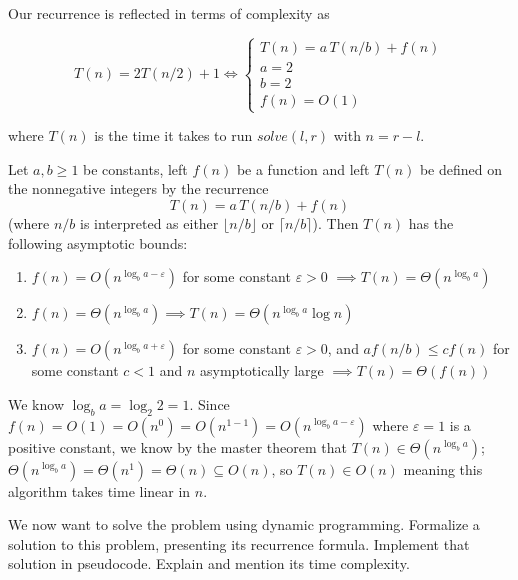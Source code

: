 {\newpage
Our recurrence is reflected in terms of complexity as

\begin{equation*}
    T(n) = 2T(n/2) + 1 \iff \begin{cases}
        T(n) = a\,T(n/b) + f(n) \\
        a = 2 \\
        b = 2 \\
        f(n) = O(1)
    \end{cases}
\end{equation*}

where $T(n)$ is the time it takes to run $solve(l, r)$ with $n = r-l$.

\begin{theorem}
    Let $a, b \geq 1$ be constants, left $f(n)$ be a function and left $T(n)$ be defined on the nonnegative integers by the recurrence
    \begin{equation*}
        T(n) = a\,T(n/b) + f(n)
    \end{equation*}
    (where $n/b$ is interpreted as either $\lfloor n/b \rfloor$ or $\lceil n/b \rceil$). Then $T(n)$ has the following asymptotic bounds:
    \begin{enumerate}
        \item $f(n) = O(n^{\log_b{a} - \varepsilon})$ for some constant $\varepsilon > 0$ $\implies T(n) = \Theta(n^{\log_b{a}})$
        \item $f(n) = \Theta(n^{\log_b{a}}) \implies T(n) = \Theta(n^{\log_b{a}} \log{n})$
        \item $f(n) = O(n^{\log_b{a} + \varepsilon})$ for some constant $\varepsilon > 0$, and $a f(n/b) \leq c f(n)$ for some constant $c < 1$ and $n$ asymptotically large $\implies T(n) = \Theta(f(n))$
    \end{enumerate}
\end{theorem}


We know $\log_b{a} = \log_2{2} = 1$. Since $f(n) = O(1) = O(n^0) = O(n^{1-1}) = O(n^{\log_b{a}-\varepsilon})$ where $\varepsilon = 1$ is a positive constant, we know by the master theorem that $T(n) \in \Theta (n^{\log_b{a}})$; $\Theta (n^{\log_b{a}}) = \Theta (n^1) = \Theta(n) \subseteq O(n)$, so $T(n) \in O(n)$ meaning this algorithm takes time linear in $n$.

We now want to solve the problem using dynamic programming. Formalize a solution to this problem, presenting its recurrence formula. Implement that solution in pseudocode. Explain and mention its time complexity.

}
